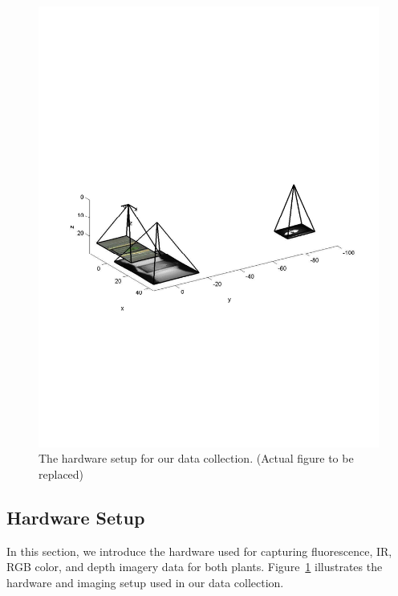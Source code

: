 \begin{figure}
  \includegraphics[width=\linewidth,trim=50 200 45 300,clip]{Figures/CameraConfiguration}
\caption{The hardware setup for our data collection. (Actual figure to be replaced)}
\label{fig:hardware}
\end{figure}

\subsection{Hardware Setup}

In this section, we introduce the hardware used for capturing fluorescence, IR, RGB color, and depth imagery data for both plants.
Figure~\ref{fig:hardware} illustrates the hardware and imaging setup used in our data collection.

